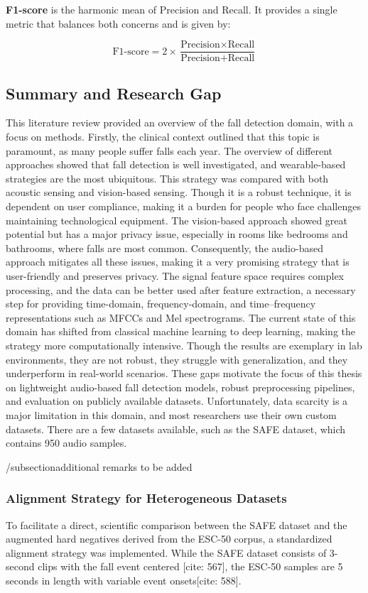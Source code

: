 \documentclass[11pt, a4paper, twoside]{article}
\begin{document}
\textbf{F1-score} is the harmonic mean of Precision and Recall. It provides a single metric that balances both concerns and is given by:

\begin{equation}
\text{F1-score} = 2 \times \frac{\text{Precision} \times \text{Recall}}{\text{Precision} + \text{Recall}}
\end{equation}


\subsection{Summary and Research Gap}
\label{summa}
This literature review provided an overview of the fall detection domain, with a focus on methods. Firstly, the clinical context outlined that this topic is paramount, as many people suffer falls each year. The overview of different approaches showed that fall detection is well investigated, and wearable-based strategies are the most ubiquitous. This strategy was compared with both acoustic sensing and vision-based sensing. Though it is a robust technique, it is dependent on user compliance, making it a burden for people who face challenges maintaining technological equipment. The vision-based approach showed great potential but has a major privacy issue, especially in rooms like bedrooms and bathrooms, where falls are most common. Consequently, the audio-based approach mitigates all these issues, making it a very promising strategy that is user-friendly and preserves privacy. The signal feature space requires complex processing, and the data can be better used after feature extraction, a necessary step for providing time-domain, frequency-domain, and time–frequency representations such as MFCCs and Mel spectrograms. The current state of this domain has shifted from classical machine learning to deep learning, making the strategy more computationally intensive. Though the results are exemplary in lab environments, they are not robust, they struggle with generalization, and they underperform in real-world scenarios. These gaps motivate the focus of this thesis on lightweight audio-based fall detection models, robust preprocessing pipelines, and evaluation on publicly available datasets. Unfortunately, data scarcity is a major limitation in this domain, and most researchers use their own custom datasets. There are a few datasets available, such as the SAFE dataset, which contains 950 audio samples. 

/subsection{additional remarks to be added}
\subsubsection{Alignment Strategy for Heterogeneous Datasets}
To facilitate a direct, scientific comparison between the SAFE dataset and the augmented hard negatives derived from the ESC-50 corpus, a standardized alignment strategy was implemented. While the SAFE dataset consists of 3-second clips with the fall event centered [cite: 567], the ESC-50 samples are 5 seconds in length with variable event onsets[cite: 588]. 
\end{document}
